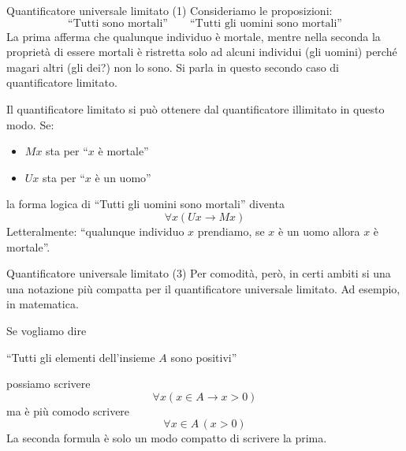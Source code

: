 \documentclass[aspectratio=169,10pt,dvipsnames,xcolor=table,handout]{beamer}
\begin{document}
\begin{frame}{Quantificatore universale limitato (1)}
    Consideriamo le proposizioni:
    \[
        \text{``Tutti sono mortali''} \qquad \text{``Tutti gli uomini sono mortali''}
    \]
    La prima afferma che qualunque individuo è mortale,  mentre nella seconda la proprietà di essere mortali è ristretta solo ad alcuni individui (gli uomini) perché magari altri (gli dei?) non lo sono. Si parla in questo secondo caso di \alert{quantificatore limitato}.

    \medskip
    Il quantificatore limitato si può ottenere dal quantificatore illimitato in questo modo. Se:
    \begin{itemize}
        \item $Mx$ sta per ``$x$ è mortale''
        \item $Ux$ sta per ``$x$ è un uomo''
    \end{itemize}
    la forma logica di ``Tutti gli uomini sono mortali'' diventa
    \[
        \forall x (Ux \to Mx)
    \]
    Letteralmente: ``qualunque individuo $x$ prendiamo, se $x$ è un uomo allora $x$ è mortale''.
\end{frame}

\begin{frame}{Quantificatore universale limitato (3)}
    Per comodità, però, in certi ambiti si una una notazione più compatta per il quantificatore universale limitato. Ad esempio, in matematica.
    \begin{example}
        Se vogliamo dire
        \begin{center}
            ``Tutti gli elementi dell'insieme $A$ sono positivi''
        \end{center}
        possiamo scrivere
        \[
            \forall x (x \in A \to x > 0)
        \]
        ma è più comodo scrivere
        \[
            \forall x \in A \, (x > 0)
        \]
        La seconda formula è solo un modo compatto di scrivere la prima.
    \end{example}
\end{frame}
\end{document}

